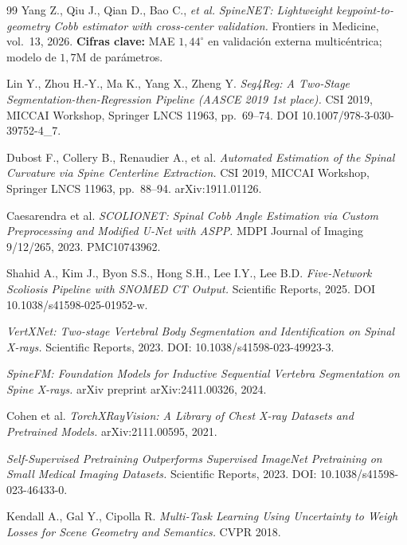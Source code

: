 \documentclass[conference]{IEEEtran}
\begin{document}
\begin{thebibliography}{99}
Yang Z., Qiu J., Qian D., Bao C., \emph{et al.}
\emph{SpineNET: Lightweight keypoint-to-geometry Cobb estimator with cross-center validation.}
Frontiers in Medicine, vol.~13, 2026.
\textbf{Cifras clave:} MAE $1{,}44^{\circ}$ en validación externa multicéntrica; modelo de $1{,}7$M de parámetros.

Lin Y., Zhou H.-Y., Ma K., Yang X., Zheng Y.
\emph{Seg4Reg: A Two-Stage Segmentation-then-Regression Pipeline (AASCE 2019 1st place).}
CSI 2019, MICCAI Workshop, Springer LNCS 11963, pp.~69--74.
DOI 10.1007/978-3-030-39752-4\_7.

Dubost F., Collery B., Renaudier A., et al.
\emph{Automated Estimation of the Spinal Curvature via Spine Centerline Extraction.}
CSI 2019, MICCAI Workshop, Springer LNCS 11963, pp.~88--94. arXiv:1911.01126.

Caesarendra et al.
\emph{SCOLIONET: Spinal Cobb Angle Estimation via Custom Preprocessing and Modified U-Net with ASPP.}
MDPI Journal of Imaging 9/12/265, 2023. PMC10743962.

Shahid A., Kim J., Byon S.S., Hong S.H., Lee I.Y., Lee B.D.
\emph{Five-Network Scoliosis Pipeline with SNOMED CT Output.}
Scientific Reports, 2025. DOI 10.1038/s41598-025-01952-w.

\emph{VertXNet: Two-stage Vertebral Body Segmentation and Identification on Spinal X-rays.}
Scientific Reports, 2023. DOI: 10.1038/s41598-023-49923-3.

\emph{SpineFM: Foundation Models for Inductive Sequential Vertebra Segmentation on Spine X-rays.}
arXiv preprint arXiv:2411.00326, 2024.

Cohen et al.
\emph{TorchXRayVision: A Library of Chest X-ray Datasets and Pretrained Models.}
arXiv:2111.00595, 2021.

\emph{Self-Supervised Pretraining Outperforms Supervised ImageNet Pretraining on Small Medical Imaging Datasets.}
Scientific Reports, 2023. DOI: 10.1038/s41598-023-46433-0.

Kendall A., Gal Y., Cipolla R.
\emph{Multi-Task Learning Using Uncertainty to Weigh Losses for Scene Geometry and Semantics.}
CVPR 2018.


\end{thebibliography}
\end{document}
